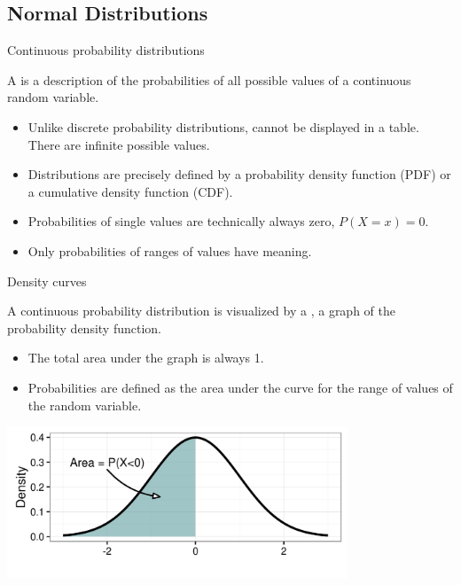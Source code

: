 \documentclass[xcolor=table, aspectratio=169, bigger, handout]{beamer}
\begin{document}
%
%
\subsection{Normal Distributions}

\begin{frame}{Continuous probability distributions}
\begin{block}{}
A  is a description of the probabilities of all possible values of a continuous random variable.
\begin{itemize}
\pause\item Unlike discrete probability distributions, cannot be displayed in a table. There are infinite possible values.
\pause\item Distributions are precisely defined by a probability density function (PDF) or a cumulative density function (CDF).
\pause\item Probabilities of single values are technically always zero, $P(X=x)=0$.
\pause\item Only probabilities of ranges of values have meaning.
\end{itemize}
\end{block}
\end{frame}

\begin{frame}{Density curves}
\begin{block}{}
A continuous probability distribution is visualized by a , a graph of the probability density function.
\begin{itemize}
\item The total area under the graph is always 1.
\item Probabilities are defined as the area under the curve for the range of values of the random variable.
\end{itemize}
\end{block}
\medskip
{\centering
\includegraphics[width=4in]{../images/wk6_density_curve}
\par}
\end{frame}
\end{document}
